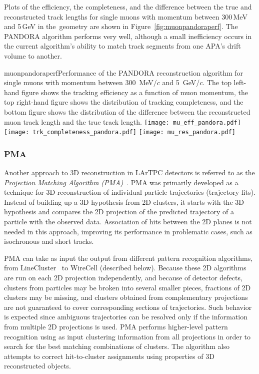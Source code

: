 Plots of the efficiency, the completeness, and the  difference between the true and reconstructed
track lengths for single muons with momentum between 300\,MeV and 5\,GeV in the~\pdsp geometry are
shown in Figure~\ref{fig:muonpandoraperf}.  The PANDORA algorithm performs very well, although a small
inefficiency occurs in the current algorithm's ability to match track segments from one APA's drift volume to another.

\begin{cdrfigure}{muonpandoraperf}{Performance of the PANDORA reconstruction algorithm for single muons with 
momentum between 300~MeV$/c$ and 5~GeV/$c$.  The top left-hand figure shows the tracking efficiency as a function of
muon momentum, the top right-hand figure shows the distribution of tracking completeness, and the bottom figure shows the
distribution of the difference between the reconstructed muon track length and the true track length.}
\texttt{[image: mu\_eff\_pandora.pdf]}
\texttt{[image: trk\_completeness\_pandora.pdf]}
\texttt{[image: mu\_res\_pandora.pdf]}
\end{cdrfigure}


\subsubsection{PMA}

Another approach to 3D reconstruction in LArTPC detectors is referred to as the \textit{Projection Matching Algorithm
(PMA)}~\cite{pma_algorithm}. PMA was primarily developed as a technique for 3D reconstruction
of individual particle trajectories (trajectory fits). 
Instead of
building up a 3D hypothesis from 2D clusters, it starts with the 3D hypothesis and compares
the 2D projection of the predicted trajectory of a particle with the observed data. Association
of hits between the 2D planes is not needed in this approach, improving its performance in
problematic cases, such as isochronous and short tracks.

PMA can take as input the output from different pattern recognition algorithms, from
LineCluster~\cite{linecluster} to WireCell (described below).  Because these 2D algorithms
are run on each 2D projection independently, and because of detector defects,
clusters from  particles may be broken
into several smaller pieces, fractions of 2D clusters may be missing,
and clusters obtained from complementary projections are not guaranteed to cover corresponding
sections of trajectories. Such behavior is expected since ambiguous 
trajectories can be resolved only if the information from multiple 2D projections is used.
PMA performs higher-level pattern recognition using as input clustering information from all
projections in order to search for the best matching combinations of clusters. The algorithm
also attempts to correct hit-to-cluster assignments using properties of 3D reconstructed objects.

